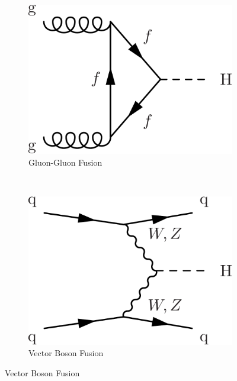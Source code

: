 \begin{figure}
    \centering
    \begin{subfigure}[h]{0.3\textwidth}
        \includegraphics[width=\textwidth]{Figures/Feynman_Diagrams/higgs_production__ggf.pdf}
        \caption{Gluon-Gluon Fusion}\label{fig:higgs_production_ggf}
      \end{subfigure}
      ~ %
      \begin{subfigure}[h]{0.3\textwidth}
        \includegraphics[width=\textwidth]{Figures/Feynman_Diagrams/higgs_production__vbf.pdf}
        \caption{Vector Boson Fusion}\label{fig:higgs_production_vbf}
      \end{subfigure}

\end{figure}

